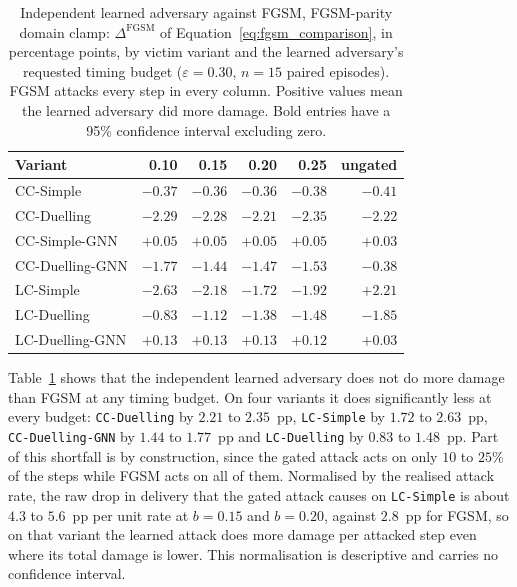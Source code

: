 \begin{table}[htbp]
  \centering
  \caption{Independent learned adversary against FGSM, FGSM-parity domain clamp:
           $\Delta^{\text{FGSM}}$ of Equation~\eqref{eq:fgsm_comparison}, in percentage
           points, by victim variant and the learned adversary's requested timing budget
           ($\varepsilon = 0.30$, $n = 15$ paired episodes). FGSM attacks every step in
           every column. Positive values mean the learned adversary did more damage.
           Bold entries have a 95\% confidence interval excluding zero.}
  \label{tab:fgsm_vs_independent}
  \begin{tabular}{lrrrrr}
    \hline
    \textbf{Variant} & \textbf{0.10} & \textbf{0.15} & \textbf{0.20} & \textbf{0.25} & \textbf{ungated} \\
    \hline
    CC-Simple        & $-0.37$ & $-0.36$ & $-0.36$ & $-0.38$ & $-0.41$ \\
    CC-Duelling      & $\mathbf{-2.29}$ & $\mathbf{-2.28}$ & $\mathbf{-2.21}$ & $\mathbf{-2.35}$ & $\mathbf{-2.22}$ \\
    CC-Simple-GNN    & $+0.05$ & $+0.05$ & $+0.05$ & $+0.05$ & $+0.03$ \\
    CC-Duelling-GNN  & $\mathbf{-1.77}$ & $\mathbf{-1.44}$ & $\mathbf{-1.47}$ & $\mathbf{-1.53}$ & $-0.38$ \\
    LC-Simple        & $\mathbf{-2.63}$ & $\mathbf{-2.18}$ & $\mathbf{-1.72}$ & $\mathbf{-1.92}$ & $\mathbf{+2.21}$ \\
    LC-Duelling      & $\mathbf{-0.83}$ & $\mathbf{-1.12}$ & $\mathbf{-1.38}$ & $\mathbf{-1.48}$ & $\mathbf{-1.85}$ \\
    LC-Duelling-GNN  & $+0.13$ & $+0.13$ & $+0.13$ & $+0.12$ & $+0.03$ \\
    \hline
  \end{tabular}
\end{table}

Table~\ref{tab:fgsm_vs_independent} shows that the independent learned adversary does
not do more damage than FGSM at any timing budget. On four variants it does
significantly less at every budget: \texttt{CC-Duelling} by $2.21$ to $2.35$~pp,
\texttt{LC-Simple} by $1.72$ to $2.63$~pp, \texttt{CC-Duelling-GNN} by $1.44$ to
$1.77$~pp and \texttt{LC-Duelling} by $0.83$ to $1.48$~pp. Part of this shortfall is by
construction, since the gated attack acts on only $10$ to $25\%$ of the steps while
FGSM acts on all of them. Normalised by the realised attack rate, the raw drop in
delivery that the gated attack causes on \texttt{LC-Simple} is about $4.3$ to $5.6$~pp
per unit rate at $b = 0.15$ and $b = 0.20$, against $2.8$~pp for FGSM, so on that
variant the learned attack does more damage per attacked step even where its total
damage is lower. This normalisation is descriptive and carries no confidence interval.

